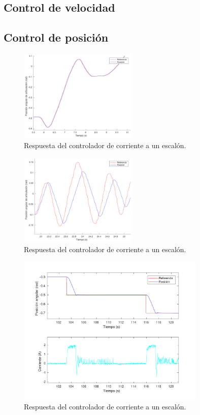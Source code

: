 \subsection{Control de velocidad}

\subsection{Control de posición}

\begin{figure}[H]
  \centering
  \includegraphics[width=0.5\textwidth]{img/cap5/ref_basica}
  \caption{Respuesta del controlador de corriente a un escalón.}
  \label{cap5_ref_basica}
\end{figure}



\begin{figure}[H]
  \centering
  \includegraphics[width=0.5\textwidth]{img/cap5/ref_retardo_vel}
  \caption{Respuesta del controlador de corriente a un escalón.}
  \label{cap5_ref_retardo_vel}
\end{figure}

\begin{figure}[H]
  \centering
  \includegraphics[width=0.8\textwidth]{img/cap5/ref_corriente_limitada}
  \caption{Respuesta del controlador de corriente a un escalón.}
  \label{cap5_ref_corriente_limitada}
\end{figure}

